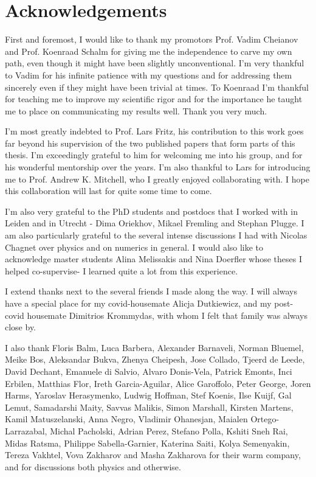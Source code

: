 \newpage
\thispagestyle{empty}

\chapter*{Acknowledgements}
\label{Acknowledgements}

First and foremost, I would like to thank my promotors Prof. Vadim Cheianov and Prof. Koenraad Schalm for giving me the independence to carve my own path, even though it might have been slightly unconventional. I'm very thankful to Vadim for his infinite patience with my questions and for addressing them sincerely even if they might have been trivial at times. To Koenraad I'm thankful for teaching me to improve my scientific rigor and for the importance he taught me to place on communicating my results well. Thank you very much. 
\par
I'm most greatly indebted to Prof. Lars Fritz, his contribution to this work goes far beyond his supervision of the two published papers that form parts of this thesis. I'm exceedingly grateful to him for welcoming me into his group, and for his wonderful mentorship over the years. I'm also thankful to Lars for introducing me to Prof. Andrew K. Mitchell, who I greatly enjoyed collaborating with. I hope this collaboration will last for quite some time to come. 
\par
I'm also very grateful to the PhD students and postdocs that I worked with in Leiden and in Utrecht - Dima Oriekhov, Mikael Fremling and Stephan Plugge. I am also particularly grateful to the several intense discussions I had with Nicolas Chagnet over physics and on numerics in general. I would also like to acknowledge master students Alina Melissakis and Nina Doerfler whose theses I helped co-supervise- I learned quite a lot from this experience.
\par
I extend thanks next to the several friends I made along the way. I will always have a special place for my covid-housemate Alicja Dutkiewicz, and my post-covid housemate Dimitrios Krommydas, with whom I felt that family was always close by. 
\par
I also thank Floris Balm, Luca Barbera, Alexander Barnaveli, Norman Bluemel,  Meike Bos, Aleksandar Bukva, Zhenya Cheipesh, Jose Collado, Tjeerd de Leede, David Dechant, Emanuele di Salvio, Alvaro Donis-Vela, Patrick Emonts, Inci Erbilen, Matthias Flor, Ireth Garcia-Aguilar, Alice Garoffolo, Peter George, Joren Harms, Yaroslav Herasymenko, Ludwig Hoffman, Stef Koenis, Ilse Kuijf, Gal Lemut, Samadarshi Maity, Savvas Malikis, Simon Marshall, Kirsten Martens, Kamil Matuszelanski, Anna Negro, Vladimir Ohanesjan, Maialen Ortego-Larrazabal, Michal Pacholski, Adrian Perez, Stefano Polla, Kshiti Sneh Rai, Midas Ratsma, Philippe Sabella-Garnier, Katerina Saiti, Kolya Semenyakin, Tereza Vakhtel, Vova Zakharov and Masha Zakharova for their warm company, and for discussions both physics and otherwise. 
